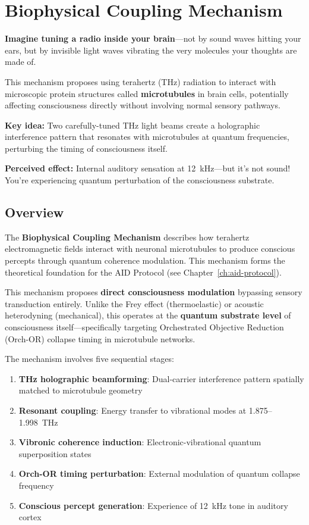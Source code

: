 \chapter{Biophysical Coupling Mechanism}
\label{ch:biophysical-coupling}

\begin{nontechnical}
\textbf{Imagine tuning a radio inside your brain}---not by sound waves hitting your ears, but by invisible light waves vibrating the very molecules your thoughts are made of.

This mechanism proposes using terahertz (THz) radiation to interact with microscopic protein structures called \textbf{microtubules} in brain cells, potentially affecting consciousness directly without involving normal sensory pathways.

\textbf{Key idea:} Two carefully-tuned THz light beams create a holographic interference pattern that resonates with microtubules at quantum frequencies, perturbing the timing of consciousness itself.

\textbf{Perceived effect:} Internal auditory sensation at 12~kHz---but it's not sound! You're experiencing quantum perturbation of the consciousness substrate.
\end{nontechnical}

\section{Overview}

The \textbf{Biophysical Coupling Mechanism} describes how terahertz electromagnetic fields interact with neuronal microtubules to produce conscious percepts through quantum coherence modulation. This mechanism forms the theoretical foundation for the AID Protocol (see Chapter~\ref{ch:aid-protocol}).

\begin{keyconcept}
This mechanism proposes \textbf{direct consciousness modulation} bypassing sensory transduction entirely. Unlike the Frey effect (thermoelastic) or acoustic heterodyning (mechanical), this operates at the \textbf{quantum substrate level} of consciousness itself---specifically targeting Orchestrated Objective Reduction (Orch-OR) collapse timing in microtubule networks.
\end{keyconcept}

The mechanism involves five sequential stages:
\begin{enumerate}
\item \textbf{THz holographic beamforming}: Dual-carrier interference pattern spatially matched to microtubule geometry
\item \textbf{Resonant coupling}: Energy transfer to vibrational modes at 1.875--1.998~THz
\item \textbf{Vibronic coherence induction}: Electronic-vibrational quantum superposition states
\item \textbf{Orch-OR timing perturbation}: External modulation of quantum collapse frequency
\item \textbf{Conscious percept generation}: Experience of 12~kHz tone in auditory cortex
\end{enumerate}

